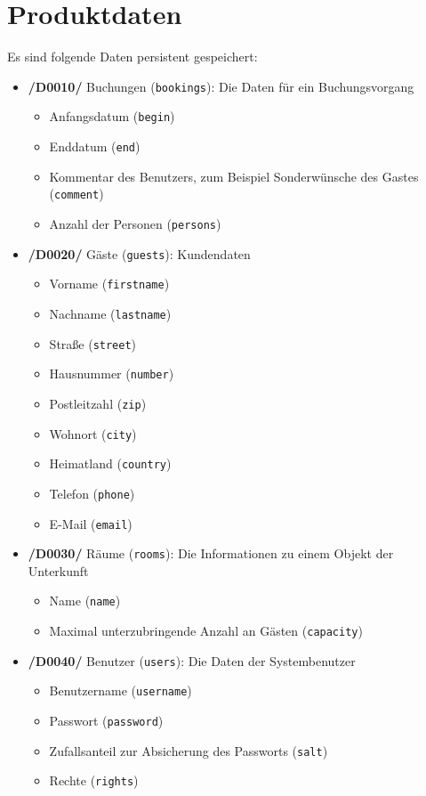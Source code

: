 \documentclass[a4paper,oneside]{scrreprt}
\begin{document}
\chapter{Produktdaten}
Es sind folgende Daten persistent gespeichert:

\begin{itemize}
\item \textbf{/D0010/} Buchungen (\texttt{bookings}): Die Daten für ein Buchungsvorgang
    \begin{itemize}
    \item Anfangsdatum (\texttt{begin})
    \item Enddatum (\texttt{end})
    \item Kommentar des Benutzers, zum Beispiel Sonderwünsche des Gastes (\texttt{comment})
    \item Anzahl der Personen (\texttt{persons})
    \end{itemize}

\item \textbf{/D0020/} Gäste (\texttt{guests}): Kundendaten
    \begin{itemize}
    \item Vorname (\texttt{firstname})
    \item Nachname (\texttt{lastname})
    \item Straße (\texttt{street})
    \item Hausnummer (\texttt{number})
    \item Postleitzahl (\texttt{zip})
    \item Wohnort (\texttt{city})
    \item Heimatland (\texttt{country})
    \item Telefon (\texttt{phone})
    \item E-Mail (\texttt{email})
    \end{itemize}

\item \textbf{/D0030/} Räume (\texttt{rooms}): Die Informationen zu einem Objekt der Unterkunft
    \begin{itemize}
    \item Name (\texttt{name})
    \item Maximal unterzubringende Anzahl an Gästen (\texttt{capacity})
    \end{itemize}

\item \textbf{/D0040/} Benutzer (\texttt{users}): Die Daten der Systembenutzer
    \begin{itemize}
    \item Benutzername (\texttt{username})
    \item Passwort (\texttt{password})
    \item Zufallsanteil zur Absicherung des Passworts (\texttt{salt})
    \item Rechte (\texttt{rights})
    \end{itemize}
\end{itemize}
\end{document}
